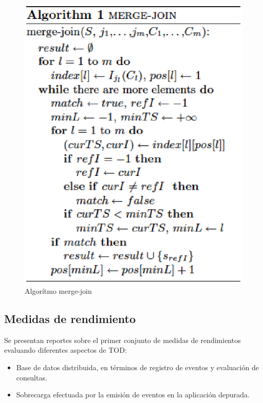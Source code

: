\documentclass[12pt,legalpaper]{report}
\begin{document}
\begin{itemize}
\begin{figure}[h]
	\centering
	\includegraphics[scale=0.4]{images/TOD/mergeJoin.eps}
	\caption{Algorítmo merge-join}
	\label{mergeJoin}
\end{figure}
\end{itemize}

		\subsection{Medidas de rendimiento}

Se presentan reportes sobre el primer conjunto de medidas de rendimientos evaluando diferentes aspectos de TOD:

\begin{itemize}
	\item Base de datos distribuida, en términos de registro de eventos y evaluación de consultas.
	\item Sobrecarga efectuada por la emisión de eventos en la aplicación depurada.
\end{itemize}
\end{document}
